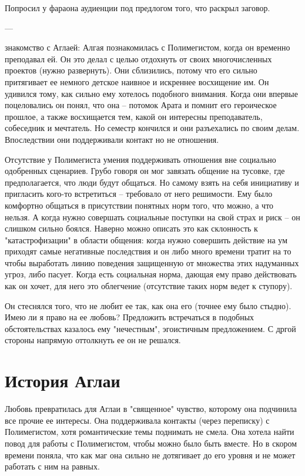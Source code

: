 \documentclass[12pt,a4paper]{article}
\begin{document}
Попросил у фараона аудиенции под предлогом того, что раскрыл заговор.



---

знакомство с Аглаей:
Алгая познакомилась с Полимегистом, когда он временно преподавал ей.
Он это делал с целью отдохнуть от своих многочисленных проектов (нужно развернуть). Они сблизились, потому что его сильно притягивает ее немного детское наивное и искреннее восхищение им. Он удивился тому, как сильно ему хотелось подобного внимания. Когда они впервые поцеловались он понял, что она -- потомок Арата и помнит его героическое прошлое, а также восхищается тем, какой он интересны преподаватель, собеседник и мечтатель.
Но семестр кончился и они разъехались по своим делам.
Впоследствии они поддерживали контакт но не отношения.

Отсутствие у Полимегиста умения поддерживать отношения вне социально одобренных сценариев. Грубо говоря он мог завязать общение на тусовке, где предполагается, что люди будут общаться. Но самому взять на себя инициативу и пригласить кого-то встретиться -- требовало от него решимости. Ему было комфортно общаться в присутствии понятных норм того, что можно, а что нельзя. А когда нужно совершать социальные поступки на свой страх и риск -- он слишком сильно боялся. Наверно можно описать это как склонность к "катастрофизации" в области общения: когда нужно совершить действие на ум приходят самые негативные последствия и он либо много времени тратит на то чтобы выработать линию поведения защищенную от множества этих надуманных угроз, либо пасует. Когда есть социальная норма, дающая ему право действовать как он хочет, для него это облегчение (отсутствие таких норм ведет к ступору).

Он стеснялся того, что не любит ее так, как она его (точнее ему было стыдно). Имею ли я право на ее любовь? Предложить встречаться в подобных обстоятельствах казалось ему "нечестным", эгоистичным предложением. С дргой стороны напрямую оттолкнуть ее он не решался.

\section*{История Аглаи}
Любовь превратилась для Аглаи в "священное" чувство, которому она подчинила все прочие ее интересы. Она поддерживала контакты (через переписку) с Полимегистом, хотя романтические темы поднимать не смела.
Она хотела найти повод для работы с Полимегистом, чтобы можно было быть вместе. Но в скором времени поняла, что как маг она сильно не дотягивает до его уровня и не может работать с ним на равных.
\end{document}
